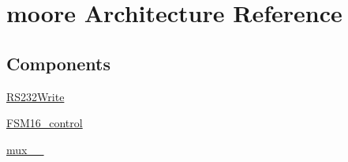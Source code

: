 \hypertarget{class_r_s232_write__16_1_1moore}{}\section{moore Architecture Reference}
\label{class_r_s232_write__16_1_1moore}
\subsection*{Components}
 \begin{DoxyCompactItemize}
\item 
\hyperlink{class_r_s232_write__16_1_1moore_a67debac7a4a7156ddbcdd6475a09d232}{R\+S232\+Write}  {\bfseries }  
\item 
\hyperlink{class_r_s232_write__16_1_1moore_a4cd529e1a64cef8d508355f555417249}{F\+S\+M16\+\_\+control}  {\bfseries }  
\item 
\hyperlink{class_r_s232_write__16_1_1moore_af7b97c2aee5bead67cbfa0a796a84dc8}{mux\+\_\+\_}  {\bfseries }  
\end{DoxyCompactItemize}
